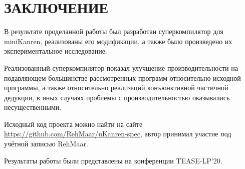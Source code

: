 \section*{ЗАКЛЮЧЕНИЕ}

В результате проделанной работы был разработан суперкомпилятор для miniKanren,
реализованы его модификации, а также было произведено их экспериментальное исследование.

Реализованный суперкомпилятор показал улучшение производительности на подавляющем
большинстве рассмотренных программ относительно исходной программы, а также относительно
реализаций конъюнктивной частичной дедукции,
в иных случаях проблемы с производительностью оказывались несущественными.

Исходный код проекта можно найти на сайте \url{https://github.com/RehMaar/uKanren-spec},
автор принимал участие под учётной записью RehMaar.

Результаты работы были представлены на конференции TEASE-LP'20.

